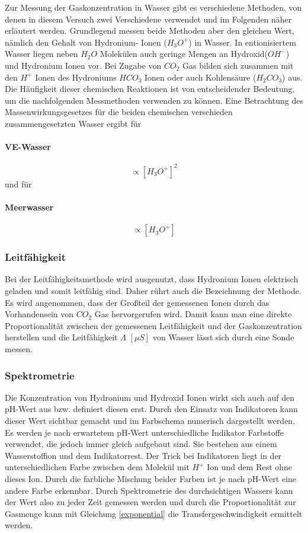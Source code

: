 \documentclass[12pt]{article}
\begin{document}
Zur Messung der Gaskonzentration in Wasser gibt es verschiedene Methoden, von denen in diesem Versuch zwei Verschiedene verwendet und im Folgenden näher erläutert werden.
Grundlegend messen beide Methoden aber den gleichen Wert, nämlich den Gehalt von Hydronium- Ionen ($H_3O^+$) in Wasser. 
In entionisiertem Wasser liegen neben $H_2O$ Molekülen auch geringe Mengen an Hydroxid($OH^-$) und Hydronium Ionen vor. Bei Zugabe von $CO_2$ Gas bilden sich zusammen mit den $H^+$ Ionen des Hydroniums $HCO_3$ Ionen oder auch Kohlensäure ($H_2CO_3$) aus. Die Häufigkeit dieser chemischen Reaktionen ist von entscheidender Bedeutung, um die nachfolgenden Messmethoden verwenden zu können. Eine Betrachtung des Massenwirkungsgesetzes für die beiden chemischen verschieden zusammengesetzten Wasser ergibt für 
\paragraph*{VE-Wasser}
\begin{equation}
	[CO_2] \propto [H_3O^+]^2
\end{equation}
und für 
\paragraph*{Meerwasser}
\begin{equation}
	[CO^2] \propto [H_3O^+]
\end{equation}

\subsubsection{Leitfähigkeit}
Bei der Leitfähigkeitsmethode wird ausgenutzt, dass Hydronium Ionen elektrisch geladen und somit leitfähig sind. Daher rührt auch die Bezeichnung der Methode. 
Es wird angenommen, dass der Großteil der gemessenen Ionen durch das Vorhandensein von $CO_2$ Gas hervorgerufen wird. 
Damit kann man eine direkte Proportionalität zwischen der gemessenen Leitfähigkeit und der Gaskonzentration herstellen und die Leitfähigkeit $\Lambda$ $[\mu S]$ von Wasser lässt sich durch eine Sonde messen. 

\subsubsection{Spektrometrie}
Die Konzentration von Hydronium und Hydroxid Ionen wirkt sich auch auf den pH-Wert aus bzw. definiert diesen erst. 
Durch den Einsatz von Indikatoren kann dieser Wert sichtbar gemacht und im Farbschema numerisch dargestellt werden. 
Es werden je nach erwartetem pH-Wert unterschiedliche Indikator Farbstoffe verwendet, die jedoch immer gleich aufgebaut sind. Sie bestehen aus einem Wasserstoffion und dem Indikatorrest. Der Trick bei Indikatoren liegt in der unterschiedlichen Farbe zwischen dem Molekül mit $H^+$ Ion und dem Rest ohne dieses Ion. Durch die farbliche Mischung beider Farben ist je nach pH-Wert eine andere Farbe erkennbar. 
Durch Spektrometrie des durchsichtigen Wassers kann der Wert also zu jeder Zeit gemessen werden und durch die Proportionalität zur Gasmenge kann mit Gleichung \ref{exponential} die Transfergeschwindigkeit ermittelt werden.
\end{document}
